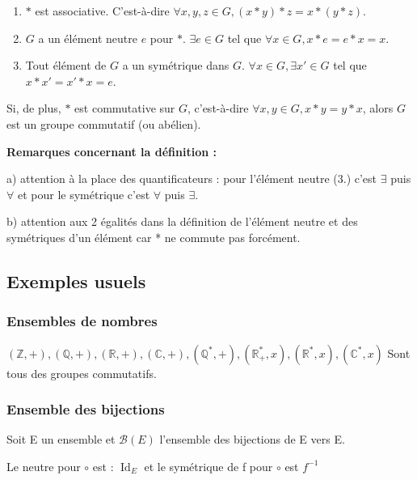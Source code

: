 \documentclass[12pt,a4paper,french]{book}
\begin{document}
\begin{spacing}{1.0}
\begin{spacing}{1.0}
{\begin{minipage}{\textwidth}
\begin{enumerate}[itemsep=2pt, topsep=1pt, partopsep=0pt, parsep=1pt]
						\item \( * \) est associative. C'est-à-dire \(\forall x, y, z \in G, (x * y) * z = x * (y * z)\).
						
						\item \( G \) a un élément neutre \( e \) pour \( * \). \(\exists e \in G\) tel que \(\forall x \in G, x * e = e * x = x\).
						
						\item Tout élément de \( G \) a un symétrique dans \( G \). \(\forall x \in G, \exists x' \in G\) tel que \(x * x' = x' * x = e\).
					\end{enumerate}
				\end{minipage}
			}
			
			Si, de plus, \( * \) est commutative sur \( G \), c'est-à-dire \(\forall x, y \in G, x * y = y * x\), alors \( G \) est un groupe commutatif (ou abélien).
			
			\textbf{Remarques concernant la définition :}
			 
			a) attention à la place des quantificateurs : pour l'élément neutre (3.) c'est \(\exists\) puis \(\forall\) et pour le symétrique c'est \(\forall\) puis \(\exists\).
			
			b) attention aux 2 égalités dans la définition de l'élément neutre et des symétriques d'un élément car * ne commute pas forcément.
		\end{spacing}
		\subsection{Exemples usuels}
			\subsubsection{Ensembles de nombres}
			\((\mathbb{Z}, +), (\mathbb{Q}, +), (\mathbb{R}, +), (\mathbb{C}, +), (\mathbb{Q}^*, +), (\mathbb{R}^*_+, x), (\mathbb{R}^*, x), (\mathbb{C}^*, x)\)
			Sont tous des groupes commutatifs.
			\subsubsection{Ensemble des bijections}
			\begin{spacing}{1.0}
			Soit E un ensemble et \(\mathscr{B}(E)\) l'ensemble des bijections de E vers E.
			\begin{center}
			\end{center}
			Le neutre pour \(\circ\) est  : \(\operatorname{Id}_E\) et le symétrique de f pour \(\circ\) est \(f^{-1}\)
			\end{spacing}

\end{spacing}
\end{document}
